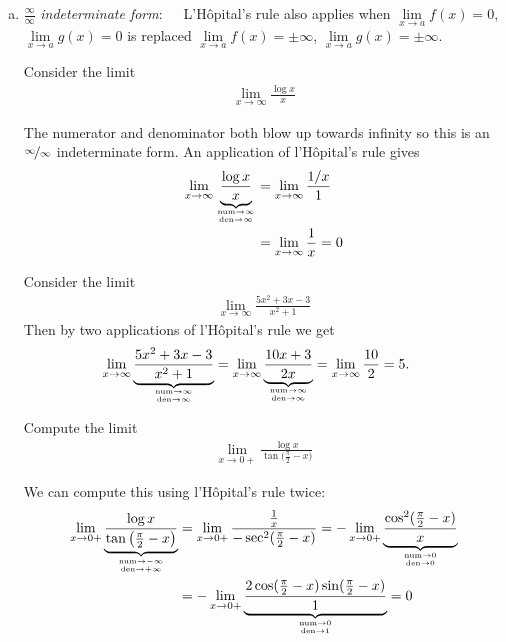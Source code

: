 \begin{enumerate}[(a)]
\item $\frac{\infty}{\infty}$ \emph{indeterminate form}:\ \ \
L'H\^opital's rule also applies when
$\lim\limits_{x\rightarrow a}f(x)=0$, $\lim\limits_{x\rightarrow a}g(x)=0$
is replaced $\lim\limits_{x\rightarrow a}f(x)=\pm\infty$,
$\lim\limits_{x\rightarrow a}g(x)=\pm\infty$.

\begin{eg}
 Consider the limit
\begin{align*}
  \lim_{x \to \infty} \frac{\log x}{x}
\end{align*}

  The numerator and denominator both blow up towards infinity so this is an
$\nicefrac\infty\infty$ indeterminate form. An application of l'H\^opital's rule gives
\begin{align*}
  \lim_{x \to \infty}
  \underbrace{\frac{\log x}{x}}_{\atp
  {\mathrm{num}\rightarrow \infty}{\mathrm{den}\rightarrow \infty}}
 &= \lim_{x \to \infty} \frac{1/x}{1} \\
 &= \lim_{x \to \infty} \frac{1}{x} = 0
\end{align*}
\end{eg}

\begin{eg}
 Consider the limit
\begin{align*}
  \lim_{x \to \infty} \frac{5x^2+3x-3}{x^2+1}
\end{align*}
  Then by two applications of l'H\^opital's rule we get
\begin{align*}
  \lim_{x \to \infty}
  \underbrace{\frac{5x^2+3x-3}{x^2+1}}_{\atp
  {\mathrm{num}\rightarrow \infty}{\mathrm{den}\rightarrow \infty}}
 &= \lim_{x \to \infty}
  \underbrace{\frac{10x+3}{2x}}_{\atp
  {\mathrm{num}\rightarrow \infty}{\mathrm{den}\rightarrow \infty}}
 = \lim_{x \to \infty} \frac{10}{2}
  = 5.
\end{align*}
\end{eg}


\begin{eg}\label{eg:hopitalI}
Compute the limit
\begin{align*}
\lim_{x\rightarrow 0+} \frac{\log x}{\tan\big(\frac{\pi}{2}-x\big)}
\end{align*}

We can compute this using l'H\^opital's rule twice:
\begin{align*}
\lim_{x\rightarrow 0+}\underbrace{\frac{\log x}
      {\tan\big(\frac{\pi}{2}-x\big)}}_{\atp
        {\mathrm{num}\rightarrow -\infty}
        {\mathrm{den}\rightarrow +\infty}}
& =\lim_{x\rightarrow 0+}\frac{\frac{1}{x}}
                          {-\sec^2(\frac{\pi}{2}-x)}
=-\lim_{x\rightarrow 0+}\underbrace{\frac{\cos^2(\frac{\pi}{2}-x)}{x}}_{\atp
        {\mathrm{num}\rightarrow 0}
        {\mathrm{den}\rightarrow 0}} \\
&=-\lim_{x\rightarrow 0+}\underbrace{\frac
          {2\cos(\frac{\pi}{2}-x)\sin(\frac{\pi}{2}-x)}{1}}_{\atp
        {\mathrm{num}\rightarrow 0}
        {\mathrm{den}\rightarrow 1}}
=0
\end{align*}


\end{eg}
\end{enumerate}
